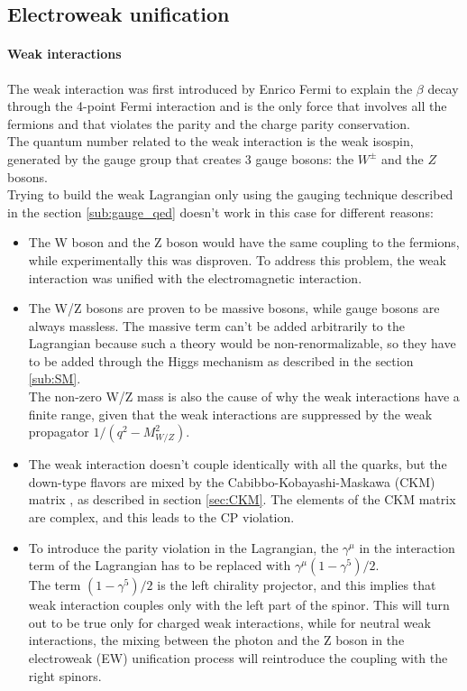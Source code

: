 \subsection{Electroweak unification}\label{sub:weak}
\paragraph*{Weak interactions}
The weak interaction was first introduced by Enrico Fermi to explain the $\beta$ decay through the 4-point Fermi interaction \cite{Fermi1934Tentativo} and is the only force that involves all the fermions and that violates the parity and the charge parity conservation. \\
The quantum number related to the weak interaction is the weak isospin, generated by the  gauge group that creates 3 gauge bosons: the $W^\pm$ and the $Z$ bosons.\\
Trying to build the weak Lagrangian only using the gauging technique described in the section \ref{sub:gauge_qed} doesn't work in this case for different reasons:
\begin{itemize}
    \item The W boson and the Z boson would have the same coupling to the fermions, while experimentally this was disproven. To address this problem, the weak interaction was unified with the electromagnetic interaction.
    \item The W/Z bosons are proven to be massive bosons, while gauge bosons are always massless. The massive term can't be added arbitrarily to the Lagrangian because such a theory would be non-renormalizable, so they have to be added through the Higgs mechanism as described in the section \ref{sub:SM}.\\
    The non-zero W/Z mass is also the cause of why the weak interactions have a finite range, given that the weak interactions are suppressed by the weak propagator $1/(q^2-M_{W/Z}^2)$.
    \item The weak interaction doesn't couple identically with all the quarks, but the down-type flavors are mixed by the Cabibbo-Kobayashi-Maskawa (CKM) matrix \cite{Kobayashi1973CP-ViolationInteraction}, as described in section \ref{sec:CKM}. The elements of the CKM matrix are complex, and this leads to the CP violation.
    \item To introduce the parity violation in the Lagrangian, the $\gamma^\mu$ in the interaction term of the Lagrangian has to be replaced with $\gamma^\mu \left(1-\gamma^5 \right)/2 $.\\
    The term $(1-\gamma^5)/2$ is the left chirality projector, and this implies that weak interaction couples only with the left part of the spinor. This will turn out to be true only for charged weak interactions, while for neutral weak interactions, the mixing between the photon and the Z boson in the electroweak (EW) unification process will reintroduce the coupling with the right spinors.
\end{itemize}

